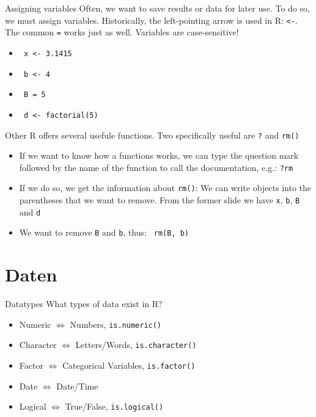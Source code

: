 \documentclass[xcolor=dvipsnames, aspectratio = 169]{beamer}
\begin{document}
\begin{frame}[fragile]{Assigning variables}
Often, we want to save results or data for later use. To do so, we must assign variables. Historically, the left-pointing arrow is used in R: \verb+<-+. The common \verb+=+ works just as well. Variables are case-sensitive!
\begin{itemize}
	\item \verb+ x <- 3.1415+
	\item \verb+ b <- 4+
	\item \verb+ B = 5+
	\item \verb+ d <- factorial(5)+
\end{itemize}
\end{frame}

\begin{frame}[fragile]{Other}
R offers several usefule functions. Two specifically useful are \verb+?+ and \verb+rm()+
\begin{itemize}
	\item If we want to know how a functions works, we can type the question mark followed by the name of the function to call the documentation, e.g.: \verb+?rm+
	\item If we do so, we get the information about \verb+rm()+: We can write objects into the parentheses that we want to remove. From the former slide we have \verb+x+, \verb+b+, \verb+B+ and \verb+d+
	\item We want to remove \verb+B+ and \verb+b+, thus: \verb+ rm(B, b)+
\end{itemize}
\end{frame}

\section{Daten}
\begin{frame}[fragile]{Datatypes}
	What types of data exist in R?
	\begin{itemize}
		\item Numeric $\Leftrightarrow$ Numbers, \verb+is.numeric()+
		\item Character $\Leftrightarrow$ Letters/Words, \verb+is.character()+
		\item Factor $\Leftrightarrow$ Categorical Variables, \verb+is.factor()+
		\item Date $\Leftrightarrow$ Date/Time
		\item Logical $\Leftrightarrow$ True/False, \verb+is.logical()+
	\end{itemize}
\end{frame}
\end{document}
